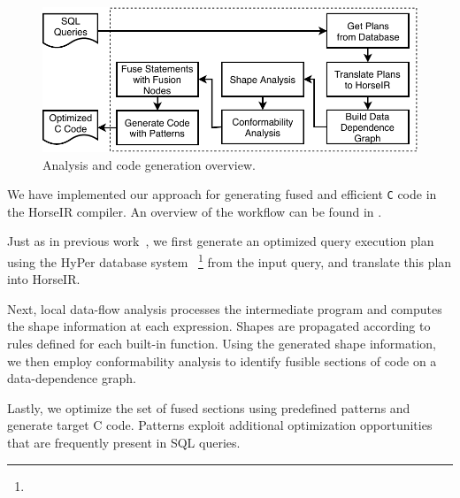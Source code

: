 \begin{figure}[htbp]
\centering
\includegraphics[width=\columnwidth]{./src/figure/overview-v4.pdf}
\caption{Analysis and code generation overview.} \label{fig:overview}
\end{figure}

We have implemented our approach for generating fused and efficient
\texttt{C} code in the HorseIR compiler. An overview of the workflow
can be found in .

Just as in previous work~\OldPaper, we first generate an optimized
query execution plan using the HyPer database system~\cite{Neumann2011:HyPer}
\footnote{}
from the input query, and translate this plan into HorseIR.

Next, local data-flow analysis processes the intermediate program and
computes the shape information at each expression. Shapes are propagated
according to rules defined for each built-in function. Using the
generated shape information, we then employ conformability analysis to
identify fusible sections of code on a data-dependence graph.

Lastly, we optimize the set of fused sections using predefined patterns
and generate target C code. Patterns exploit additional optimization
opportunities that are frequently present in SQL queries.

